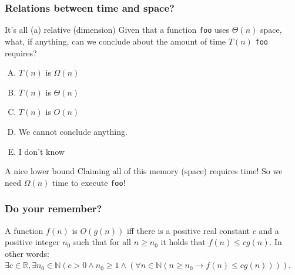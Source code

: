 \begin{frame}
	\frametitle{Relations between time and space?}
	\begin{block}{It's all (a) relative (dimension)}
		Given that a function \texttt{foo} uses $\Theta(n)$ space, what, if anything, can we conclude about the amount of
		time $T(n)$ \texttt{foo} requires?
		\begin{enumerate}[A.]
			\item $T(n)$ is $\Omega(n)$
			\item $T(n)$ is $\Theta(n)$
			\item $T(n)$ is $O(n)$
			\item We cannot conclude anything.
			\item I don't know
		\end{enumerate}
	\end{block}
		\pause
		\begin{block}{A nice lower bound}
			Claiming all of this memory (space) requires time! So we need $\Omega(n)$ time to execute \texttt{foo}!
		\end{block}
\end{frame}

\begin{frame}
	\frametitle{Do your remember?}
	\begin{definition}[Big-Oh]
		A function $f(n)$ is $O(g(n))$ iff there is a positive real constant $c$ and a positive integer $n_0$ such that for
		all $n \geq n_0$ it holds that $f(n) \leq c g(n)$. In other words:\\
		$\exists c \in \mathbb{R}, \exists n_0 \in \mathbb{N} (c > 0 \wedge n_0 \geq 1 \wedge (\forall n \in \mathbb{N} (n
		\geq n_0 \to f(n) \leq cg(n))))$.
	\end{definition}
	\pause
	\begin{columns}
		
		\pause	
	\end{columns}
\end{frame}

